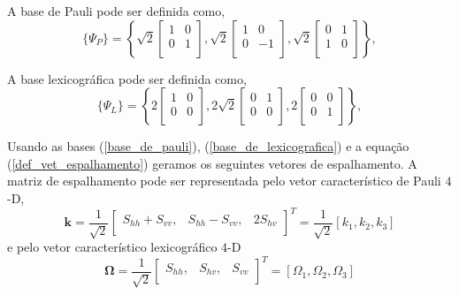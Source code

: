 A base de Pauli pode ser definida como,
\begin{equation}\label{base_de_pauli_3m}
\{\Psi_P\} = \left\{
\sqrt{2}\left[\begin{array}{cc}
	1  & 0  \\
	0  & 1 \\
\end{array}\right],
\sqrt{2}\left[\begin{array}{cc}
	1  & 0  \\
	0  & -1  \\
\end{array}\right],
\sqrt{2}\left[\begin{array}{cc}
	0  & 1  \\
	1  & 0  \\
\end{array}\right]
\right\},
\end{equation}

A base lexicográfica pode ser definida como,
\begin{equation}\label{base_de_lexicografica_3m}
\{\Psi_L\} = \left\{
2\left[\begin{array}{cc}
	1  & 0  \\
	0  & 0 \\
\end{array}\right],
2\sqrt{2}\left[\begin{array}{cc}
	0  & 1  \\
	0  & 0  \\
\end{array}\right],
2\left[\begin{array}{cc}
	0  & 0  \\
	0  & 1  \\
\end{array}\right]
\right\},
\end{equation}

Usando as bases (\ref{base_de_pauli}), (\ref{base_de_lexicografica}) e a equação (\ref{def_vet_espalhamento}) geramos os seguintes vetores de espalhamento. A matriz de espalhamento pode ser representada pelo vetor característico de Pauli $4$-D,
\begin{equation}\label{vetor_pauli_3d}
\mathbf{k}= \frac{1}{\sqrt{2}}\left[
	\begin{array}{ccc}
	S_{hh} + S_{vv},& S_{hh} - S_{vv},& 2S_{hv}   \\
\end{array}\right]^T=\frac{1}{\sqrt{2}}[k_1,k_2, k_3]
\end{equation}
e pelo vetor característico lexicográfico $4$-D 
\begin{equation}\label{vetor_lexicografico_3d}
\mathbf{\Omega}= \frac{1}{\sqrt{2}}\left[
	\begin{array}{ccc}
	S_{hh},& S_{hv},& S_{vv}   \\
\end{array}\right]^T=[\Omega_1, \Omega_2, \Omega_3]
\end{equation}

